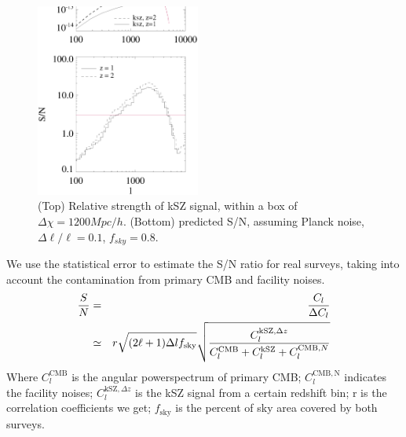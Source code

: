\begin{figure}[tbp]
\begin{center}
\includegraphics[width=0.48\textwidth]{figure/Cl_rsd_sn_z1z2.eps}
\end{center}
\vspace{-0.7cm}
\caption{(Top) Relative strength of kSZ signal, within a box of $\Delta \chi=1200 Mpc/h$. 
    (Bottom) predicted S/N, assuming Planck noise, $\Delta \ell/\ell=0.1$, $f_{sky}=0.8$. 
}
\label{fig:sn}
\end{figure}
We use the statistical error to estimate the S/N ratio for real surveys, 
taking into account the contamination from primary CMB and facility noises.
\begin{eqnarray}
    \frac{S}{N}&=&\frac{C_l}{\Delta C_l}\\\nonumber
               &\simeq&
    r\sqrt{(2\ell+1)\Delta l f_\mathrm{sky}}\sqrt{\frac{C_l^{\mathrm{kSZ},\Delta z}}{C_l^{\mathrm{CMB}}+C_l^\mathrm{kSZ}+C_l^{\mathrm{CMB},N}}}
\end{eqnarray}
Where $C_l^\mathrm{CMB}$ is the angular powerspectrum of primary CMB; 
$C_l^\mathrm{CMB,N}$ indicates the facility noises; 
$C_l^{\mathrm{kSZ},\Delta z}$ is the kSZ signal from a certain redshift bin; 
r is the correlation coefficients we get; 
$f_\mathrm{sky}$ is the percent of sky area covered by both surveys.

